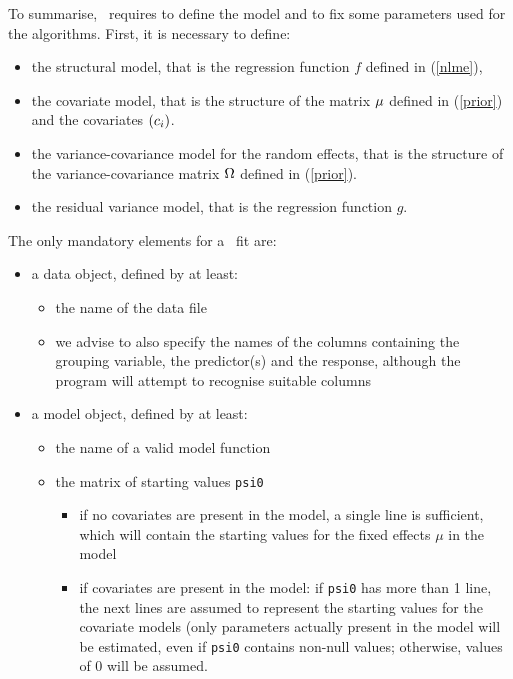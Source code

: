 To summarise, \monolix~requires to define the model and to fix some parameters used for the algorithms. First, it is necessary to define:
\begin{itemize}
\item the structural model, that is the regression function $f$ defined in (\ref{nlme}),
\item the covariate model, that is the structure of the matrix $\fixed_effect$ defined in (\ref{prior}) and the covariates $(c_i)$.
\item the variance-covariance model for the random effects, that is the structure of the variance-covariance matrix ${\Omega}$ defined in (\ref{prior}).
\item the residual variance model, that is the regression function $g$.
\end{itemize}
The only mandatory elements for a \monolix~fit are:
\begin{itemize}
\item a data object, defined by at least: 
   \begin{itemize}
   \item the name of the data file
   \item we advise to also specify the names of the columns containing the grouping variable, the predictor(s) and the response, although the program will attempt to recognise suitable columns
   \end{itemize}
\item a model object, defined by at least:
   \begin{itemize}
   \item the name of a valid model function
   \item the matrix of starting values \texttt{psi0}
      \begin{itemize}
      \item if no covariates are present in the model, a single line is sufficient, which will contain the starting values for the fixed effects $\mu$ in the model
      \item if covariates are present in the model: if \texttt{psi0} has more than 1 line, the next lines are assumed to represent the starting values for the covariate models (only parameters actually present in the model will be estimated, even if \texttt{psi0} contains non-null values; otherwise, values of 0 will be assumed.
      \end{itemize}
   \end{itemize}
\end{itemize}

